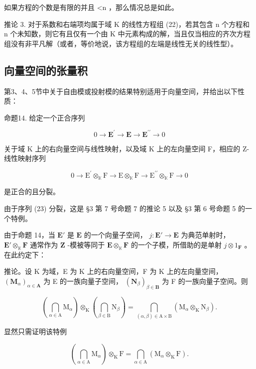 如果方程的个数是有限的并且 \textless n ，那么情况总是如此。

推论 3. 对于系数和右端项均属于域 K 的线性方程组 (22)，若其包含 n 个方程和 n 个未知数，则它有且仅有一个由 K 中元素构成的解，当且仅当相应的齐次方程组没有非平凡解（或者，等价地说，该方程组的左端是线性无关的线性型）。

\subsection{向量空间的张量积}

第3、4、5节中关于自由模或投射模的结果特别适用于向量空间，并给出以下性质：

命题14. 给定一个正合序列

\[
0 \rightarrow \mathbf {E} ^ {\prime} \rightarrow \mathbf {E} \rightarrow \mathbf {E} ^ {\prime \prime} \rightarrow 0\tag{23}
\]

关于域 K 上的右向量空间与线性映射，以及域 K 上的左向量空间 F，相应的 Z-线性映射序列

\[
0 \rightarrow \mathrm{E} ^ {\prime} \otimes_ {\mathbb {K}} \mathrm{F} \rightarrow \mathrm{E} \otimes_ {\mathbb {K}} \mathrm{F} \rightarrow \mathrm{E} ^ {\prime \prime} \otimes_ {\mathbb {K}} \mathrm{F} \rightarrow 0
\]

是正合的且分裂。

由于序列 (23) 分裂，这是 §3 第 7 号命题 7 的推论 5 以及 §3 第 6 号命题 5 的一个特例。

由于命题 14，当 \(\mathbf{E}'\) 是 \(\mathbf{E}\) 的一个向量子空间， \(j: \mathbf{E}' \to \mathbf{E}\) 为典范单射时， \(\mathbf{E}' \otimes_{\mathbb{K}} \mathbf{F}\) 通常作为 \(\mathbf{Z}\) -模被等同于 \(\mathbf{E} \otimes_{\mathbb{K}} \mathbf{F}\) 的一个子模，所借助的是单射 \(j \otimes 1_{\mathbf{F}}\) 。在此约定下：

推论。设 K 为域，E 为 K 上的右向量空间，F 为 K 上的左向量空间， \((\mathbf{M}_{\alpha})_{\alpha \in \mathbf{A}}\) 为 E 的一族向量子空间， \((\mathbf{N}_{\beta})_{\beta \in \mathbf{B}}\) 为 F 的一族向量子空间。则

\[
\left(\bigcap_ {\alpha \in \mathrm{A}} \mathrm{M} _ {\alpha}\right) \otimes_ {\mathrm{K}} \left(\bigcap_ {\beta \in \mathrm{B}} \mathrm{N} _ {\beta}\right) = \bigcap_ {(\alpha , \beta) \in \mathrm{A} \times \mathrm{B}} \left(\mathrm{M} _ {\alpha} \otimes_ {\mathrm{K}} \mathrm{N} _ {\beta}\right).\tag{24}
\]

显然只需证明该特例

\[
\left(\bigcap_ {\alpha \in \mathrm{A}} \mathrm{M} _ {\alpha}\right) \otimes_ {\mathrm{K}} \mathrm{F} = \bigcap_ {\alpha \in \mathrm{A}} \left(\mathrm{M} _ {\alpha} \otimes_ {\mathrm{K}} \mathrm{F}\right).\tag{25}
\]

